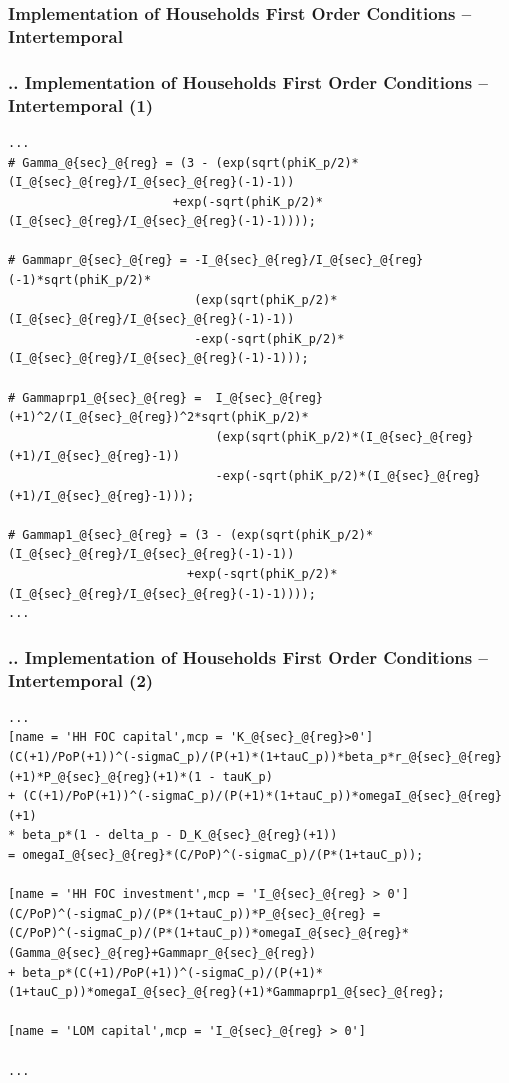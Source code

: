 \documentclass[11pt,aspectratio=169]{beamer}
\begin{document}
\subsubsection{Implementation of Households First Order Conditions -- Intertemporal}
\begin{frame}[fragile]
\frametitle{{\thesection.\thesubsection.\thesubsubsection} Implementation of Households First Order Conditions -- Intertemporal (1)}

\begin{lstlisting}[frame = single]
...
# Gamma_@{sec}_@{reg} = (3 - (exp(sqrt(phiK_p/2)*(I_@{sec}_@{reg}/I_@{sec}_@{reg}(-1)-1))
                       +exp(-sqrt(phiK_p/2)*(I_@{sec}_@{reg}/I_@{sec}_@{reg}(-1)-1))));
												
# Gammapr_@{sec}_@{reg} = -I_@{sec}_@{reg}/I_@{sec}_@{reg}(-1)*sqrt(phiK_p/2)*
                          (exp(sqrt(phiK_p/2)*(I_@{sec}_@{reg}/I_@{sec}_@{reg}(-1)-1))
                          -exp(-sqrt(phiK_p/2)*(I_@{sec}_@{reg}/I_@{sec}_@{reg}(-1)-1)));
													
# Gammaprp1_@{sec}_@{reg} =  I_@{sec}_@{reg}(+1)^2/(I_@{sec}_@{reg})^2*sqrt(phiK_p/2)*
                             (exp(sqrt(phiK_p/2)*(I_@{sec}_@{reg}(+1)/I_@{sec}_@{reg}-1)) 
                             -exp(-sqrt(phiK_p/2)*(I_@{sec}_@{reg}(+1)/I_@{sec}_@{reg}-1)));
														
# Gammap1_@{sec}_@{reg} = (3 - (exp(sqrt(phiK_p/2)*(I_@{sec}_@{reg}/I_@{sec}_@{reg}(-1)-1))
                         +exp(-sqrt(phiK_p/2)*(I_@{sec}_@{reg}/I_@{sec}_@{reg}(-1)-1))));
...
\end{lstlisting}
\end{frame}

\begin{frame}[fragile]
\frametitle{{\thesection.\thesubsection.\thesubsubsection} Implementation of Households First Order Conditions -- Intertemporal (2)}

\begin{lstlisting}[frame = single]
...
[name = 'HH FOC capital',mcp = 'K_@{sec}_@{reg}>0']
(C(+1)/PoP(+1))^(-sigmaC_p)/(P(+1)*(1+tauC_p))*beta_p*r_@{sec}_@{reg}(+1)*P_@{sec}_@{reg}(+1)*(1 - tauK_p)
+ (C(+1)/PoP(+1))^(-sigmaC_p)/(P(+1)*(1+tauC_p))*omegaI_@{sec}_@{reg}(+1) 
* beta_p*(1 - delta_p - D_K_@{sec}_@{reg}(+1))
= omegaI_@{sec}_@{reg}*(C/PoP)^(-sigmaC_p)/(P*(1+tauC_p));

[name = 'HH FOC investment',mcp = 'I_@{sec}_@{reg} > 0']       
(C/PoP)^(-sigmaC_p)/(P*(1+tauC_p))*P_@{sec}_@{reg} = 
(C/PoP)^(-sigmaC_p)/(P*(1+tauC_p))*omegaI_@{sec}_@{reg}*(Gamma_@{sec}_@{reg}+Gammapr_@{sec}_@{reg})
+ beta_p*(C(+1)/PoP(+1))^(-sigmaC_p)/(P(+1)*(1+tauC_p))*omegaI_@{sec}_@{reg}(+1)*Gammaprp1_@{sec}_@{reg};
				
[name = 'LOM capital',mcp = 'I_@{sec}_@{reg} > 0']

...
\end{lstlisting}
\end{frame}
\end{document}
